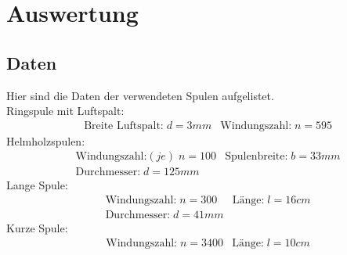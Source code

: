 \section{Auswertung}
\subsection{Daten}
Hier sind die Daten der verwendeten Spulen
aufgelistet.\\
\noindent Ringspule mit Luftspalt:\\
\begin{align*}
  &\text{Breite Luftspalt:}\; d=3mm &\text{Windungszahl:}\; n=595
\end{align*}
\noindent Helmholzspulen:\\
\begin{align*}
  &\text{Windungszahl:}(je)\; n=100 &\text{Spulenbreite:}\; b=33mm\\
  &\text{Durchmesser:}\; d=125mm
\end{align*}
Lange Spule:\\
\begin{align*}
  &\text{Windungszahl:}\; n=300 &\text{Länge:}\; l=16cm\\
  &\text{Durchmesser:}\; d=41mm
\end{align*}
Kurze Spule:\\
\begin{align*}
  &\text{Windungszahl:}\; n=3400 &\text{Länge:}\; l=10cm\\
\end{align*}

